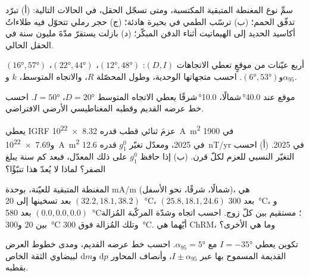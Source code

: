 \begin{exercise}[$\star$]\label{exo:b3:palaeomagnetism:4}
سمِّ نوع المغنطة المتبقية المكتسبة، ومتى تسجّل الحقل، في الحالات التالية: (أ) تبرّد تدفّق الحمم؛
(ب) ترسّب الطمي في بحيرة هادئة؛ (ج) حجر رملي تتحوّل فيه طلاءاتُ أكاسيد الحديد
إلى الهيماتيت أثناء الدفن المبكّر؛ (د) بازلت يستقرّ
مدّةَ مليون سنة في الحقل الحالي.
\end{exercise}

\begin{exercise}[$\star\star$]\label{exo:b3:palaeomagnetism:5}
أربع عيّنات من موقعٍ تعطي الاتجاهات $(D, I)$: $(\ang{12}, \ang{48})$،
$(\ang{22}, \ang{44})$، $(\ang{16}, \ang{57})$ و$(\ang{6}, \ang{53})$.
احسب متجهاتها الوحدية، وطول المحصّلة $R$، والاتجاه المتوسط، $k$
و$\alpha_{95}$.
\end{exercise}

\begin{exercise}[$\star\star$]\label{exo:b3:palaeomagnetism:6}
موقع عند \ang{40.0}\,شمالًا، \ang{10.0}\,شرقًا يعطي الاتجاه المتوسط $D = \ang{20}$،
$I = \ang{50}$. احسب خط عرضه القديم وقطبه المغناطيسي الأرضي الافتراضي.
\end{exercise}

\begin{exercise}[$\star\star$]\label{exo:b3:palaeomagnetism:7}
يعطي IGRF عزمَ ثنائي قطب قدره \qty{8.32e22}{A.m^2} في 1900
و\qty{7.69e22}{A.m^2} في 2025، ومعدّل تغيّر $g_1^0$ قدره
\qty{+12.6}{nT/yr} في 2025. (أ) احسب التغيّر النسبي للعزم لكلّ
قرن. (ب) إذا حافظ $g_1^0$ على ذلك المعدّل، فبعد كم سنة يبلغ الصفر؟
لماذا لا يُعدّ هذا تنبّؤًا؟
\end{exercise}

\begin{exercise}[$\star\star$]\label{exo:b3:palaeomagnetism:8}
المغنطة المتبقية للعيّنة، بوحدة \unit{mA/m} (شمالًا، شرقًا، نحو الأسفل)، هي
$(32.2, 18.1, 38.2)$ بعد تسخينها إلى \qty{20}{\celsius}، $(25.8, 18.1, 24.6)$
بعد \qty{300}{\celsius}، و$(0.0, 0.0, 0.0)$ بعد \qty{580}{\celsius}؛  مستقيم بين كلّ زوج. احسب اتجاه
وشدّة المركّبة المُزالة بين 20 و\qty{300}{\celsius}
وتلك المُزالة فوق \qty{300}{\celsius}. أيّهما هي ChRM، وما هي
الأخرى؟
\end{exercise}

\begin{exercise}[$\star\star$]\label{exo:b3:palaeomagnetism:9}
تكوين يعطي $I = \ang{-35}$ مع $\alpha_{95} = \ang{5}$. احسب خط عرضه
القديم، ومدى خطوط العرض القديمة المسموح بها عبر $I \pm \alpha_{95}$،
وأنصاف المحاور $\mathrm dp$ و$\mathrm dm$ لبيضاوي الثقة
الخاص بقطبه.
\end{exercise}

